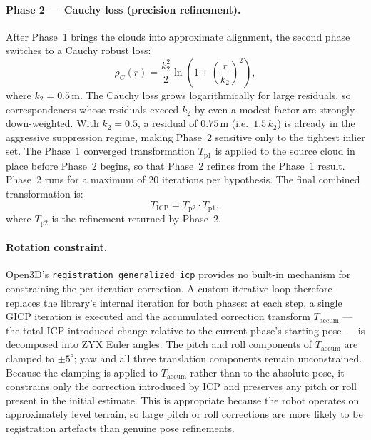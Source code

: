 \paragraph{Phase 2 --- Cauchy loss (precision refinement).}
After Phase~1 brings the clouds into approximate alignment, the second phase switches to a Cauchy robust loss:
%
\begin{equation}
    \rho_C(r) = \frac{k_2^2}{2} \ln\!\left(1 + \left(\frac{r}{k_2}\right)^2\right),
    \label{eq:cauchy-loss}
\end{equation}
%
where $k_2 = 0.5$\,m. The Cauchy loss grows logarithmically for large residuals, so correspondences whose residuals exceed $k_2$ by even a modest factor are strongly down-weighted. With $k_2 = 0.5$, a residual of $0.75$\,m (i.e.\ $1.5\,k_2$) is already in the aggressive suppression regime, making Phase~2 sensitive only to the tightest inlier set. The Phase~1 converged transformation $T_{\text{p1}}$ is applied to the source cloud in place before Phase~2 begins, so that Phase~2 refines from the Phase~1 result. Phase~2 runs for a maximum of 20 iterations per hypothesis. The final combined transformation is:
%
\begin{equation}
    T_{\text{ICP}} = T_{\text{p2}} \cdot T_{\text{p1}},
    \label{eq:icp-combined}
\end{equation}
%
where $T_{\text{p2}}$ is the refinement returned by Phase~2.

\paragraph{Rotation constraint.}
Open3D's \texttt{registration\_generalized\_icp} provides no built-in mechanism for constraining the per-iteration correction. A custom iterative loop therefore replaces the library's internal iteration for both phases: at each step, a single GICP iteration is executed and the accumulated correction transform $T_{\text{accum}}$ --- the total ICP-introduced change relative to the current phase's starting pose --- is decomposed into ZYX Euler angles. The pitch and roll components of $T_{\text{accum}}$ are clamped to $\pm 5^{\circ}$; yaw and all three translation components remain unconstrained. Because the clamping is applied to $T_{\text{accum}}$ rather than to the absolute pose, it constrains only the correction introduced by ICP and preserves any pitch or roll present in the initial estimate. This is appropriate because the robot operates on approximately level terrain, so large pitch or roll corrections are more likely to be registration artefacts than genuine pose refinements.

